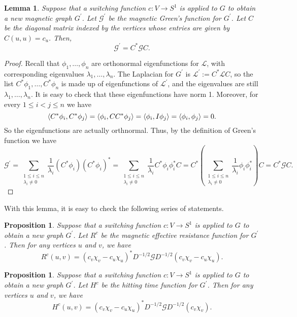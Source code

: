 \documentclass{article}
\newtheorem{prop}[thm]{Proposition}
\newtheorem{lem}[thm]{Lemma}
\theoremstyle{definition}
\newcommand{\lap}{\mathcal{L}}
\newcommand{\green}{\mathcal{G}}
\DeclarePairedDelimiter\inner{\langle}{\rangle}
\begin{document}
\begin{lem}
Suppose that a switching function $c: V \rightarrow S^1$ is applied to $G$ to obtain a new magnetic graph $G^\prime$. Let $\green^\prime$ be the magnetic Green's function for $G^\prime$. Let $C$ be the diagonal matrix indexed by the vertices whose entries are given by $C(u, u) = c_u$. Then, $$\green^\prime = C^* \green C.$$
\end{lem}
\begin{proof}
Recall that $\phi_1, \dots, \phi_n$ are orthonormal eigenfunctions for $\lap$, with corresponding eigenvalues $\lambda_1, \dots, \lambda_n$. The Laplacian for $G^\prime$ is $\lap^\prime := C^* \lap C$, so the list $C^* \phi_1, \dots, C^* \phi_n$ is made up of eigenfunctions of $\lap^\prime$, and the eigenvalues are still $\lambda_1, \dots, \lambda_n$. It is easy to check that these eigenfunctions have norm 1. Moreover, for every $1 \leq i < j \leq n$ we have
$$
\inner*{C^* \phi_i, C^* \phi_j} = \inner*{\phi_i, C C^* \phi_j} = \inner*{\phi_i, I \phi_j} = \inner*{\phi_i, \phi_j} = 0.
$$
So the eigenfunctions are actually orthnormal. Thus, by the definition of Green's function we have
$$
\green^\prime = \sum_{\substack{1 \leq i \leq n \\ \lambda_i \neq 0}} \frac{1}{\lambda_i} \left( C^* \phi_i \right) \left( C^* \phi_i \right)^*
= \sum_{\substack{1 \leq i \leq n \\ \lambda_i \neq 0}} \frac{1}{\lambda_i} C^* \phi_i \phi_i^* C
= C^* \left( \sum_{\substack{1 \leq i \leq n \\ \lambda_i \neq 0}} \frac{1}{\lambda_i} \phi_i \phi_i^* \right) C
= C^* \green C.
$$
\end{proof}

With this lemma, it is easy to check the following series of statements.

\begin{prop}
Suppose that a switching function $c: V \rightarrow S^1$ is applied to $G$ to obtain a new graph $G^\prime$. Let $R^c$ be the magnetic effective resistance function for $G^\prime$. Then for any vertices $u$ and $v$, we have $$R^c(u, v) = (c_v \chi_v - c_u \chi_u)^* D^{-1/2} \green D^{-1/2} (c_v \chi_v - c_u \chi_u).$$
\end{prop}

\begin{prop}
Suppose that a switching function $c: V \rightarrow S^1$ is applied to $G$ to obtain a new graph $G^\prime$. Let $H^c$ be the hitting time function for $G^\prime$. Then for any vertices $u$ and $v$, we have $$H^c(u, v) = (c_v \chi_v - c_u \chi_u)^* D^{-1/2} \green D^{-1/2} (c_v \chi_v).$$
\end{prop}
\end{document}
